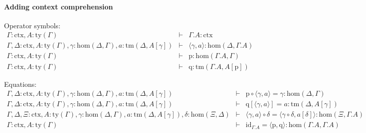 \documentclass[11pt,a4paper]{article}
\theoremstyle{definition}
\newcommand{\id}{\mathsf{id}}
\def\Hom{\mathrm{hom}}
\def\id{\mathrm{id}}
\newcommand{\ctx}{\mathrm{ctx}}
\newcommand{\ty}{\mathrm{ty}}
\newcommand{\tm}{\mathrm{tm}}
\newcommand{\tuple}[1]{\langle #1 \rangle}
\newcommand{\cext}{.}
\def\p{\mathrm{p}}
\def\q{\mathrm{q}}
\begin{document}

\paragraph{Adding context comprehension}

\begin{tiny}
Operator symbols:
\begin{eqnarray*}
\Gamma : \ctx, A:\ty(\Gamma) &\vdash& \Gamma\cext A : \ctx\\
\Gamma,\Delta : \ctx, A:\ty(\Gamma), \gamma : \Hom(\Delta,\Gamma), a:\tm(\Delta,A[\gamma]) &\vdash& \tuple{\gamma,a} : \Hom(\Delta,\Gamma\cext A)\\
\Gamma : \ctx, A:\ty(\Gamma) &\vdash& \p: \Hom(\Gamma\cext A,\Gamma)\\
\Gamma : \ctx, A:\ty(\Gamma) &\vdash& \q: \tm(\Gamma\cext A,A[\p])
\end{eqnarray*}

Equations:
\begin{eqnarray*}
\Gamma,\Delta : \ctx, A:\ty(\Gamma), \gamma : \Hom(\Delta,\Gamma), a:\tm(\Delta,A[\gamma]) &\vdash& \p\circ\tuple{\gamma,a} = \gamma : \Hom(\Delta,\Gamma)\\
\Gamma,\Delta : \ctx, A:\ty(\Gamma), \gamma : \Hom(\Delta,\Gamma), a:\tm(\Delta,A[\gamma]) &\vdash& \q[\tuple{\gamma,a}] = a : \tm(\Delta,A[\gamma]) \\
\Gamma,\Delta,\Xi : \ctx, A:\ty(\Gamma), \gamma : \Hom(\Delta,\Gamma), a:\tm(\Delta,A[\gamma]), \delta : \Hom(\Xi,\Delta) &\vdash&
\tuple{\gamma,a} \circ \delta = \tuple{\gamma\circ\delta,a[\delta]} :
\Hom(\Xi,\Gamma\cext A) \\
\Gamma : \ctx, A:\ty(\Gamma) &\vdash&
\id_{\Gamma\cext A} = \tuple{\p,\q} : \Hom(\Gamma\cext A,\Gamma\cext A)
\end{eqnarray*}
\end{tiny}
\end{document}
